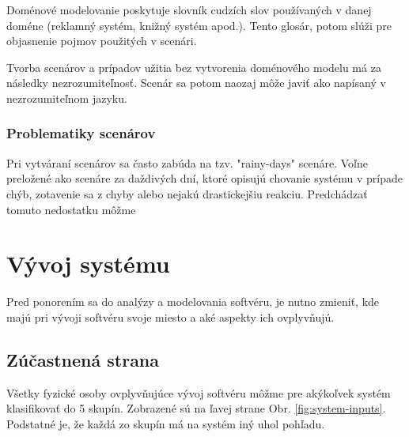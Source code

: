 Doménové modelovanie poskytuje slovník cudzích slov používaných v danej doméne (reklamný systém, knižný systém apod.). Tento glosár, potom slúži pre objasnenie pojmov použitých v scenári.

Tvorba scenárov a prípadov užitia bez vytvorenia doménového modelu má za následky nezrozumiteľnosť. Scenár sa potom naozaj môže javiť ako napísaný v nezrozumiteľnom jazyku.

\subsubsection{Problematiky scenárov}

Pri vytváraní scenárov sa často zabúda na tzv. "rainy-days" scenáre. Voľne preložené ako scenáre za daždivých dní, ktoré opisujú chovanie systému v prípade chýb, zotavenie sa z chyby alebo nejakú drastickejšiu reakciu. Predchádzať tomuto nedostatku môžme 



\section{Vývoj systému}

Pred ponorením sa do analýzy a modelovania softvéru, je nutno zmieniť, kde majú pri vývoji softvéru svoje miesto a aké aspekty ich ovplyvňujú.

\subsection{Zúčastnená strana}

Všetky fyzické osoby ovplyvňujúce vývoj softvéru môžme pre akýkoľvek systém klasifikovať do 5 skupín. Zobrazené sú na ľavej strane Obr. \ref{fig:system-inputs}. Podstatné je, že každá zo skupín má na systém iný uhol pohľadu.

